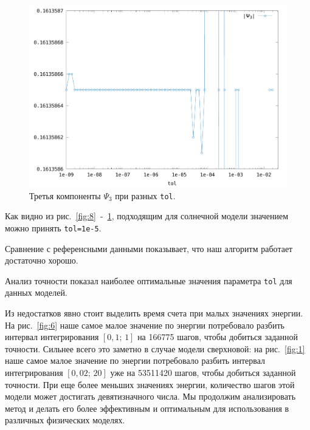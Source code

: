 \documentclass[12pt]{article}
\begin{document}
\begin{figure}[H]
  \hspace {0.5cm}
  \includegraphics[scale=0.5]{psi3_tol_sun}
  \caption{\label{fig:10}Третья компоненты \(\Psi_{3}\) при разных \texttt{tol}.}
\end{figure}

Как видно из рис.~\ref{fig:8}~-~\ref{fig:10}, подходящим для солнечной модели значением можно принять \verb|tol=1e-5|. 

Сравнение с референсными данными показывает, что наш алгоритм работает
достаточно хорошо. 

Анализ точности показал наиболее оптимальные значения параметра \verb|tol| для данных моделей. 

Из недостатков явно стоит выделить время счета при малых значениях энергии. На рис.~\ref{fig:6} наше самое малое значение по энергии потребовало разбить интервал интегрирования $[0,1;\,1]$ на 166775 шагов, чтобы добиться заданной точности.
Сильнее всего это заметно в случае модели сверхновой: на рис.~\ref{fig:1} наше самое малое значение по энергии потребовало разбить интервал интегрирования $[0,02;\,20]$ уже на 53511420 шагов, чтобы добиться заданной точности. При еще более меньших значениях энергии, количество шагов этой модели может достигать девятизначного числа.
Мы продолжим анализировать метод и делать его более эффективным и оптимальным для использования в различных физических моделях.
\end{document}
